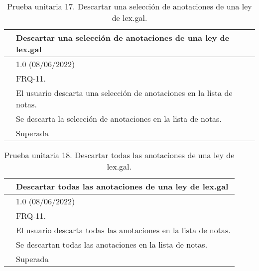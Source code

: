 \begin{table}[H]
\begin{center}
\begin{tabular}{|p{3cm}|p{10cm}|} \hline
\centering {\bf PU-17} & Descartar una selección de anotaciones de una ley de lex.gal  \\ \hline\hline
\centering {\bf Versión} & 1.0 (08/06/2022) \\ \hline
\centering {\bf Dependencias} & FRQ-11. \\ \hline
\centering {\bf Descripción} &  El usuario descarta una selección de anotaciones en la lista de notas. \\ \hline
\centering {\bf Criterio de aceptación} & Se descarta la selección de anotaciones en la lista de notas. \\ \hline
\centering {\bf Estado} & Superada \\ \hline
\end{tabular}
\caption{Prueba unitaria 17. Descartar una selección de anotaciones de una ley de lex.gal.}
\label{enlacePU17}
\end{center}
\end{table}

\begin{table}[H]
\begin{center}
\begin{tabular}{|p{3cm}|p{10cm}|} \hline
\centering {\bf PU-18} & Descartar todas las anotaciones de una ley de lex.gal  \\ \hline\hline
\centering {\bf Versión} & 1.0 (08/06/2022) \\ \hline
\centering {\bf Dependencias} & FRQ-11. \\ \hline
\centering {\bf Descripción} &  El usuario descarta todas las anotaciones en la lista de notas. \\ \hline
\centering {\bf Criterio de aceptación} & Se descartan todas las anotaciones en la lista de notas. \\ \hline
\centering {\bf Estado} & Superada \\ \hline
\end{tabular}
\caption{Prueba unitaria 18. Descartar todas las anotaciones de una ley de lex.gal.}
\label{enlacePU18}
\end{center}
\end{table}

